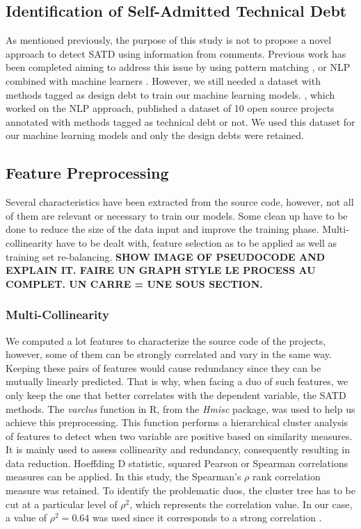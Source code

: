 \subsection{Identification of Self-Admitted Technical Debt}


As mentioned previously, the purpose of this study is not to propose a novel approach to detect \ac{SATD} using information from comments. Previous work has been completed aiming to address this issue by using pattern matching \citep{MaldonadoS15}, \citep{PotdarS14} or \ac{NLP} combined with machine learners \citep{maldonado17}. However, we still needed a dataset with methods tagged as design debt to train our machine learning models. \citet{maldonado17}, which worked on the \ac{NLP} approach, published a dataset of 10 open source projects annotated with methods tagged as technical debt or not. We used this dataset for our machine learning models and only the design debts were retained.

\subsection{Feature Preprocessing}


Several characteristics have been extracted from the source code, however, not all of them are relevant or necessary to train our models. Some clean up have to be done to reduce the size of the data input and improve the training phase. Multi-collinearity have to be dealt with, feature selection as to be applied as well as training set re-balancing. \textbf{SHOW IMAGE OF PSEUDOCODE AND EXPLAIN IT. FAIRE UN GRAPH STYLE LE PROCESS AU COMPLET. UN CARRE = UNE SOUS SECTION.}

\subsubsection{Multi-Collinearity}

We computed a lot features to characterize the source code of the projects, however, some of them can be strongly correlated and vary in the same way. Keeping these pairs of features would cause redundancy since they can be mutually linearly predicted. That is why, when facing a duo of such features, we only keep the one that better correlates with the dependent variable, the \ac{SATD} methods. The \emph{varclus} function in R, from the \emph{Hmisc} package, was used to help us achieve this preprocessing. This function performs a hierarchical cluster analysis of features to detect when two variable are positive based on similarity measures. It is mainly used to assess collinearity and redundancy, consequently resulting in data reduction. Hoeffding D statistic, squared Pearson or Spearman correlations measures can be applied. In this study, the Spearman's $\rho$ rank correlation measure was retained. To identify the problematic duos, the cluster tree has to be cut at a particular level of $\rho^2$, which represents the correlation value. In our case, a value of $\rho^2=0.64$ was used since it corresponds to a strong correlation \citep{Cohen-1988}.

